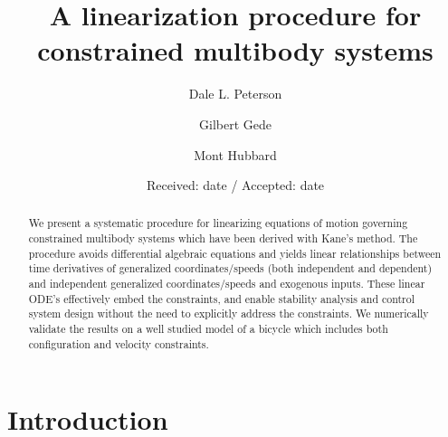 \documentclass{svjour3}                     %
\begin{document}
\title{A linearization procedure for constrained multibody systems}


\author{Dale L. Peterson\and Gilbert Gede\and Mont Hubbard}


\date{Received: date / Accepted: date}

\maketitle

\begin{abstract}
  We present a systematic procedure for linearizing equations of motion
  governing constrained multibody systems which have been derived with Kane's
  method.  The procedure avoids differential algebraic equations and yields
  linear relationships between time derivatives of generalized
  coordinates/speeds (both independent and dependent) and independent
  generalized coordinates/speeds and exogenous inputs.  These linear ODE's
  effectively embed the constraints, and enable stability analysis and control
  system design without the need to explicitly address the constraints.  We
  numerically validate the results on a well studied model of a bicycle which
  includes both configuration and velocity constraints.
\end{abstract}

\section{Introduction}
\label{intro}
\end{document}
